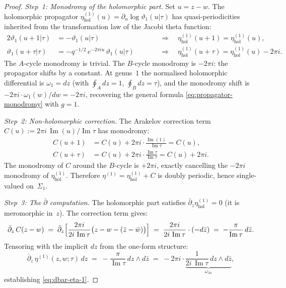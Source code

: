 \begin{proof}
\emph{Step~1: Monodromy of the holomorphic part.}
Set $u = z - w$. The holomorphic propagator
$\eta^{(1)}_{\mathrm{hol}}(u) = \partial_u \log\vartheta_1(u|\tau)$
has quasi-periodicities inherited from the transformation law of the
Jacobi theta function:
\begin{alignat}{2}
 \vartheta_1(u+1|\tau) &= -\vartheta_1(u|\tau)
 &\qquad&\Longrightarrow\quad
 \eta^{(1)}_{\mathrm{hol}}(u+1) = \eta^{(1)}_{\mathrm{hol}}(u),
 \label{eq:theta-A-cycle}\\[3pt]
 \vartheta_1(u+\tau|\tau) &= -q^{-1/2}\,e^{-2\pi i u}\,\vartheta_1(u|\tau)
 &\qquad&\Longrightarrow\quad
 \eta^{(1)}_{\mathrm{hol}}(u+\tau) = \eta^{(1)}_{\mathrm{hol}}(u) - 2\pi i.
 \label{eq:theta-B-cycle}
\end{alignat}
The $A$-cycle monodromy is trivial. The $B$-cycle monodromy is
$-2\pi i$: the propagator shifts by a constant. At genus~$1$ the
normalised holomorphic differential is $\omega_1 = dz$
(with $\oint_A dz = 1$, $\oint_B dz = \tau$), and the monodromy
shift is $-2\pi i \cdot \omega_1(w)/dw = -2\pi i$, recovering
the general formula \eqref{eq:propagator-monodromy} with $g = 1$.

\smallskip\noindent
\emph{Step~2: Non-holomorphic correction.}
The Arakelov correction term
$C(u) := 2\pi i\, \operatorname{Im}(u)/\operatorname{Im}\tau$
has monodromy:
\begin{align}
 C(u+1) &= C(u) + 2\pi i \cdot
 \frac{\operatorname{Im}(1)}{\operatorname{Im}\tau}
 = C(u), \label{eq:correction-A}\\[3pt]
 C(u+\tau) &= C(u) + 2\pi i \cdot
 \frac{\operatorname{Im}\tau}{\operatorname{Im}\tau}
 = C(u) + 2\pi i. \label{eq:correction-B}
\end{align}
The monodromy of $C$ around the $B$-cycle is $+2\pi i$, exactly
cancelling the $-2\pi i$ monodromy of $\eta^{(1)}_{\mathrm{hol}}$.
Therefore $\eta^{(1)} = \eta^{(1)}_{\mathrm{hol}} + C$ is
doubly periodic, hence single-valued on~$\Sigma_1$.

\smallskip\noindent
\emph{Step~3: The $\bar\partial$ computation.}
The holomorphic part satisfies
$\bar\partial_z \eta^{(1)}_{\mathrm{hol}} = 0$ (it is meromorphic
in~$z$). The correction term gives:
\[
 \bar\partial_z\, C(z-w)
 \;=\;
 \bar\partial_z \Bigl[
 \frac{2\pi i}{2i\,\operatorname{Im}\tau}
 \bigl(z - w - (\bar z - \bar w)\bigr)
 \Bigr]
 \;=\;
 \frac{2\pi i}{2i\,\operatorname{Im}\tau}\cdot(-d\bar z)
 \;=\;
 -\frac{\pi}{\operatorname{Im}\tau}\, d\bar z.
\]
Tensoring with the implicit $dz$ from the one-form structure:
\[
 \bar\partial_z\, \eta^{(1)}(z,w;\tau)\, dz
 \;=\;
 -\frac{\pi}{\operatorname{Im}\tau}\, dz \wedge d\bar z
 \;=\;
 -2\pi i \cdot
 \underbrace{\frac{1}{2i\,\operatorname{Im}\tau}\,
 dz \wedge d\bar z}_{\omega_{\mathrm{Ar}}},
\]
establishing \eqref{eq:dbar-eta-1}.
\end{proof}

